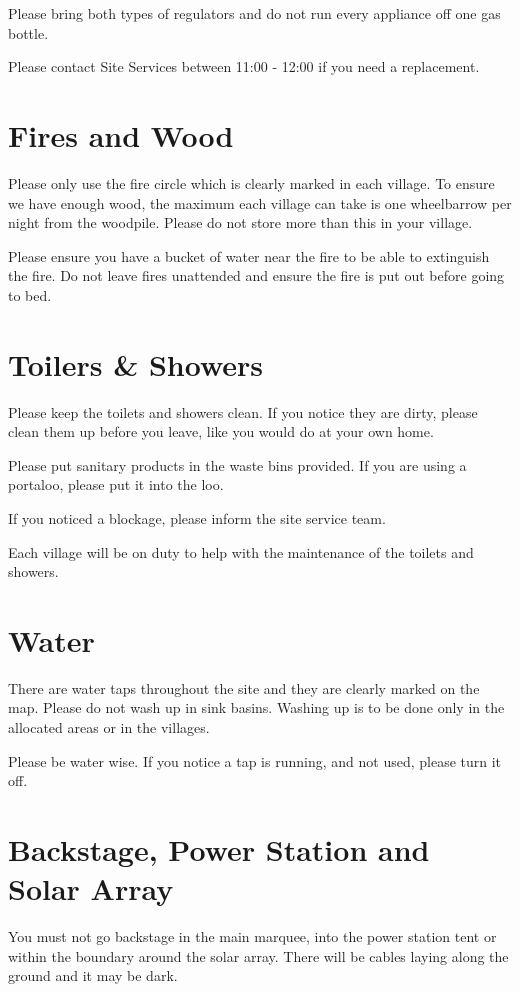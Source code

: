 \documentclass[a4paper, 11pt]{report}
\begin{document}
Please bring both types of regulators and do not run every appliance off one gas bottle.\nl

Please contact Site Services between 11:00 - 12:00 if you need a replacement.

\section{Fires and Wood}
Please only use the fire circle which is clearly marked in each village. To ensure we have enough wood, the maximum each village can take is one wheelbarrow per night from the woodpile. Please do not store more than this in your village. \nl

Please ensure you have a bucket of water near the fire to be able to extinguish the fire. Do not leave fires unattended and ensure the fire is put out before going to bed.

\section{Toilers \& Showers}
Please keep the toilets and showers clean. If you notice they are dirty, please clean them up before you leave, like you would do at your own home.\nl

Please put sanitary products in the waste bins provided. If you are using a portaloo, please put it into the loo.\nl

If you noticed a blockage, please inform the site service team.\nl

Each village will be on duty to help with the maintenance of the toilets and showers. \nl

\section{Water}
There are water taps throughout the site and they are clearly marked on the map. Please do not wash up in sink basins. Washing up is to be done only in the allocated areas or in the villages.\nl

Please be water wise. If you notice a tap is running, and not used, please turn it off.

\section{Backstage, Power Station and Solar Array}
You must not go backstage in the main marquee, into the power station tent or within the boundary around the solar array. There will be cables laying along the ground and it may be dark.\nl
\end{document}
